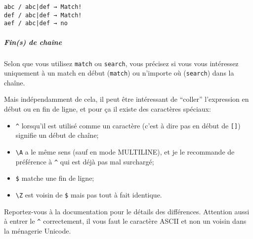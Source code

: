     \begin{Verbatim}[commandchars=\\\{\},frame=single,framerule=0.3mm,rulecolor=\color{cellframecolor}]
abc / abc|def → Match!
def / abc|def → Match!
aef / abc|def → no
\end{Verbatim}

    \hypertarget{fins-de-chauxeene}{%
\subparagraph{Fin(s) de chaîne}\label{fins-de-chauxeene}}

    Selon que vous utilisez \texttt{match} ou \texttt{search}, vous précisez
si vous vous intéressez uniquement à un match en début (\texttt{match})
ou n'importe où (\texttt{search}) dans la chaîne.

Mais indépendamment de cela, il peut être intéressant de ``coller''
l'expression en début ou en fin de ligne, et pour ça il existe des
caractères spéciaux:

\begin{itemize}
\tightlist
\item
  \texttt{\^{}} lorsqu'il est utilisé comme un caractère (c'est à dire
  pas en début de \texttt{{[}{]}}) signifie un début de chaîne;
\item
  \texttt{\textbackslash{}A} a le même sens (sauf en mode MULTILINE), et
  je le recommande de préférence à \texttt{\^{}} qui est déjà pas mal
  surchargé;
\item
  \texttt{\$} matche une fin de ligne;
\item
  \texttt{\textbackslash{}Z} est voisin de \texttt{\$} mais pas tout à
  fait identique.
\end{itemize}

Reportez-vous à la documentation pour le détails des différences.
Attention aussi à entrer le \texttt{\^{}} correctement, il vous faut le
caractère ASCII et non un voisin dans la ménagerie Unicode.

